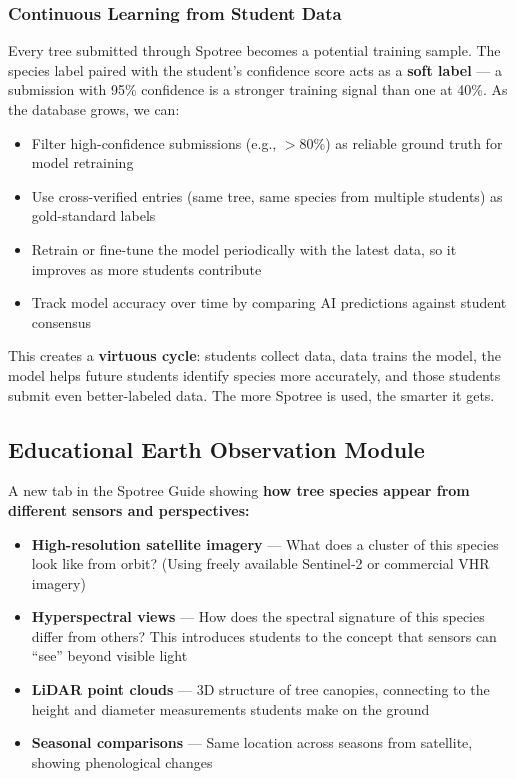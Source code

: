 \documentclass[11pt,a4paper]{article}
\begin{document}
\subsubsection{Continuous Learning from Student Data}

Every tree submitted through Spotree becomes a potential training sample. The species label paired with the student's confidence score acts as a \textbf{soft label} --- a submission with 95\% confidence is a stronger training signal than one at 40\%. As the database grows, we can:

\begin{itemize}[nosep]
  \item Filter high-confidence submissions (e.g., $>$80\%) as reliable ground truth for model retraining
  \item Use cross-verified entries (same tree, same species from multiple students) as gold-standard labels
  \item Retrain or fine-tune the model periodically with the latest data, so it improves as more students contribute
  \item Track model accuracy over time by comparing AI predictions against student consensus
\end{itemize}

This creates a \textbf{virtuous cycle}: students collect data, data trains the model, the model helps future students identify species more accurately, and those students submit even better-labeled data. The more Spotree is used, the smarter it gets.

\subsection{Educational Earth Observation Module}

A new tab in the Spotree Guide showing \textbf{how tree species appear from different sensors and perspectives:}

\begin{itemize}[nosep]
  \item \textbf{High-resolution satellite imagery} --- What does a cluster of this species look like from orbit? (Using freely available Sentinel-2 or commercial VHR imagery)
  \item \textbf{Hyperspectral views} --- How does the spectral signature of this species differ from others? This introduces students to the concept that sensors can ``see'' beyond visible light
  \item \textbf{LiDAR point clouds} --- 3D structure of tree canopies, connecting to the height and diameter measurements students make on the ground
  \item \textbf{Seasonal comparisons} --- Same location across seasons from satellite, showing phenological changes
\end{itemize}
\end{document}
